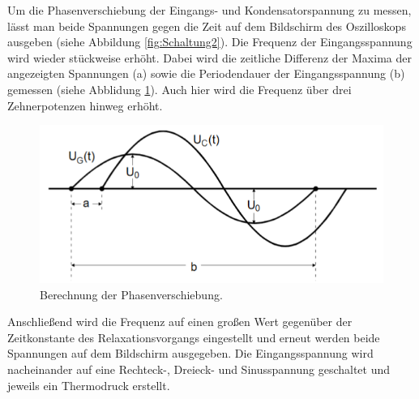 Um die Phasenverschiebung der Eingangs- und Kondensatorspannung zu messen,
lässt man beide Spannungen gegen die Zeit auf dem Bildschirm des Oszilloskops ausgeben (siehe Abbildung \ref{fig:Schaltung2}).
Die Frequenz der Eingangsspannung wird wieder stückweise erhöht. Dabei wird
die zeitliche Differenz der Maxima der angezeigten Spannungen (a) sowie die Periodendauer der Eingangsspannung (b)
gemessen (siehe Abblidung \ref{fig:Rechnung}). 
Auch hier wird die Frequenz über drei Zehnerpotenzen hinweg erhöht.

\begin{figure}[H]
  \centering
  \includegraphics[width=14cm]{Rechnung.PNG}
  \caption{Berechnung der Phasenverschiebung. \cite{sample}}
  \label{fig:Rechnung}
\end{figure}

Anschließend wird die Frequenz auf einen großen Wert gegenüber der Zeitkonstante
des Relaxationsvorgangs eingestellt und erneut werden beide Spannungen auf dem
Bildschirm ausgegeben. Die Eingangsspannung wird nacheinander auf eine Rechteck-, Dreieck-
und Sinusspannung geschaltet und jeweils ein Thermodruck erstellt.
